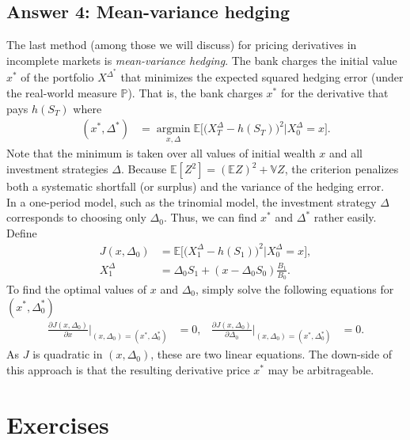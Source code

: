 \documentclass[12pt]{book}
\numberwithin{equation}{chapter}
\theoremstyle{plain}
\numberwithin{theorem}{section}
\theoremstyle{definition}
\numberwithin{exercise}{chapter}
\newcommand{\<}{\langle}
\renewcommand{\>}{\rangle}
\renewcommand{\(}{\left(}
\renewcommand{\)}{\right)}
\renewcommand{\[}{\left[}
\renewcommand{\]}{\right]}
\newcommand\Eb{\mathds{E}}
\newcommand\Pb{\mathds{P}}
\newcommand\Vb{\mathds{V}}
\newcommand\Del{\Delta}
\renewcommand\d{\partial}
\theoremstyle{definition}
\numberwithin{question}{section}
\begin{document}
\subsection{Answer 4: Mean-variance hedging}
The last method (among those we will discuss) for pricing derivatives in incomplete markets is \textit{mean-variance hedging}.  The bank charges the initial value $x^*$ of the portfolio $X^{\Del^*}$ that minimizes the expected squared hedging error (under the real-world measure $\Pb$).  That is, the bank charges $x^*$ for the derivative that pays $h(S_T)$ where
\begin{align}
(x^*,\Del^*)
	&=	\operatorname*{arg min}_{x,\Del} \Eb \Big[ \big( X_T^\Del - h(S_T) \big)^2 \Big| X_0^\Del = x \Big] .
\end{align}
Note that the minimum is taken over all values of initial wealth $x$ and all investment strategies $\Del$.  Because $\Eb [ Z^2 ] = (\Eb Z)^2 + \Vb Z$, the criterion penalizes both a systematic shortfall (or surplus) and the variance of the hedging error.
\\[0.5em]
In a one-period model, such as the trinomial model, the investment strategy $\Del$ corresponds to choosing only $\Del_0$.  Thus, we can find $x^*$ and $\Del^*$ rather easily.  Define
\begin{align}
J(x,\Del_0)
	&=	\Eb \Big[ \big( X_1^\Del - h(S_1) \big)^2 \Big| X_0^\Del = x \Big] , \label{eq:J-one-period} \\
X_1^\Del
	&=	\Del_0 S_1 + (x - \Del_0 S_0)\frac{B_1}{B_0} .
\end{align}
To find the optimal values of $x$ and $\Del_0$, simply solve the following equations for $(x^*,\Del_0^*)$
\begin{align}
\frac{\d J(x,\Del_0)}{\d x} \Big|_{(x,\Del_0)=(x^*,\Del_0^*)}
	&=	0 , &
\frac{\d J(x,\Del_0)}{\d \Del_0} \Big|_{(x,\Del_0)=(x^*,\Del_0^*)}
	&=	0 .
\end{align}
As $J$ is quadratic in $(x,\Del_0)$, these are two linear equations.  The down-side of this approach is that the resulting derivative price $x^*$ may be arbitrageable.



\section{Exercises}
\label{sec:exer-3}
\end{document}
